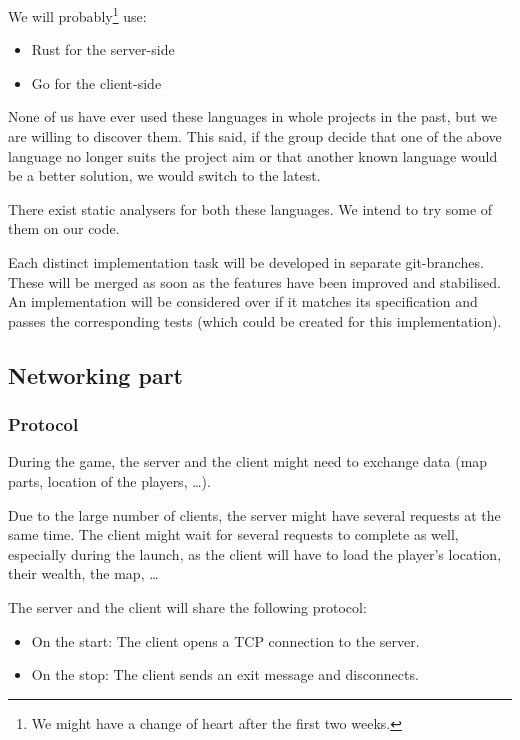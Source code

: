 \documentclass{article}
\begin{document}
We will probably\footnote{We might have a change of heart after the first two
weeks.} use:
\begin{itemize}
	\item Rust for the server-side
	\item Go for the client-side
\end{itemize}

None of us have ever used these languages in whole projects in the past, but we
are willing to discover them. This said, if the group decide that one of the
above language no longer suits the project aim or that another known language
would be a better solution, we would switch to the latest.
\medskip

There exist static analysers for both these languages. We intend to try some of
them on our code.
\medskip

Each distinct implementation task will be developed in separate git-branches.
These will be merged as soon as the features have been improved and stabilised.
An implementation will be considered over if it matches its specification and
passes the corresponding tests (which could be created for this implementation).

\subsection{Networking part}
\subsubsection{Protocol}
During the game, the server and the client might need to exchange data (map
parts, location of the players, \dots).

Due to the large number of clients, the server might have several requests at
the same time. The client might wait for several requests to complete as well,
especially during the launch, as the client will have to load the player's
location, their wealth, the map, \dots

\medskip

The server and the client will share the following protocol:
\begin{itemize}
	\item On the start: The client opens a TCP connection to the server.
	\item On the stop: The client sends an exit message and disconnects.
\end{itemize}
\end{document}
